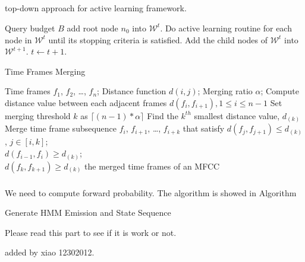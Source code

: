\documentclass{article}
\begin{document}
\subsection{}
\begin{algorithm}
\caption{top-down approach for active learning framework.}
\label{alg:topdown}
\begin{algorithmic}
    \REQUIRE Query budget $B$
    \REPEAT
        \STATE add root node $n_0$ into $\mathcal{W}^{t}$.
        \REPEAT
            \STATE Do active learning routine for each node in $\mathcal{W}^{t}$ until its stopping criteria is satisfied.
            \STATE Add the child nodes of $\mathcal{W}^{t}$ into $\mathcal{W}^{t+1}$.
            \STATE $t \leftarrow t + 1$.
\end{algorithmic}
\end{algorithm}

\begin{algorithm}
  \caption{Time Frames Merging}
  \label{alg:time frame mergence}
  \begin{algorithmic}
    \REQUIRE
    Time frames $f_1$, $f_2$, \ldots, $f_n$; Distance function $d(i,j)$; Merging ratio $\alpha$;
     \STATE Compute distance value between each adjacent frames $d(f_i,f_{i+1}),1\leq i \leq n-1$
     \STATE Set merging threshold $k$ as $\lceil (n-1)* \alpha \rceil$
     \STATE Find the $k^{th}$ smallest distance value, $d_{(k)}$
     \STATE Merge time frame subsequence $f_i$, $f_{i+1}$, \ldots, $f_{i+k}$ 
     that satisfy $d(f_j,f_{j+1}) \leq d_{(k)}$, $j\in[i,k]$;\\
              \hspace{9mm}     $d(f_{i-1},f_i) \geq d_{(k)}$;\\
               \hspace{9mm}    $d(f_k,f_{k+1}) \geq d_{(k)}$
     \STATE \Return the merged time frames of an MFCC
  \end{algorithmic}
\end{algorithm}

\subsubsection{}
We need to compute forward probability. The algorithm is showed in Algorithm
\begin{algorithm}
\SetAlgoLined
{}
\caption{Generate HMM Emission and State Sequence}
\label{alg:p11}
Please read this part to see if it is work or not.

added by xiao 12302012.

\end{algorithm}
\end{document}
